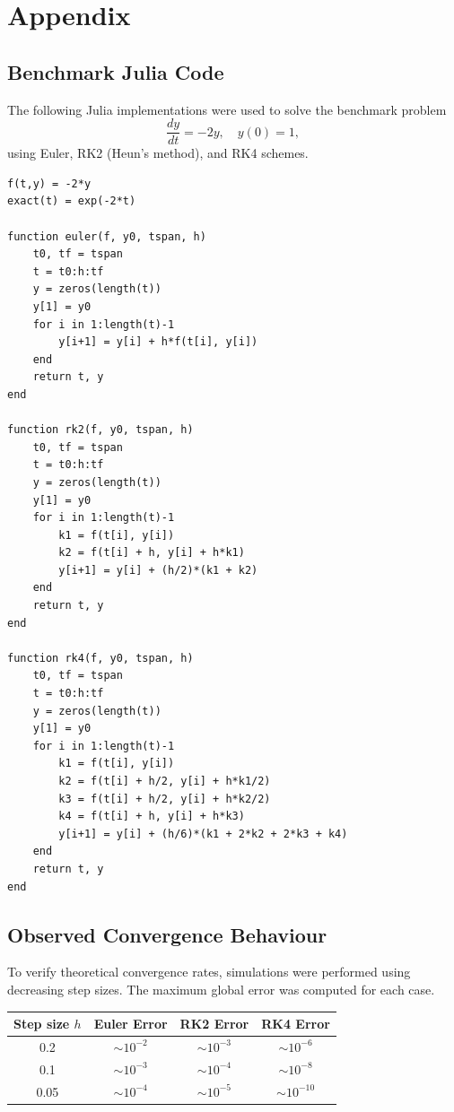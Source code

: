 \documentclass{article}
\begin{document}
\section{Appendix}

\subsection{Benchmark Julia Code}

The following Julia implementations were used to solve the benchmark problem
\[
\frac{dy}{dt} = -2y, \quad y(0)=1,
\]
using Euler, RK2 (Heun’s method), and RK4 schemes.

\begin{verbatim}
f(t,y) = -2*y
exact(t) = exp(-2*t)

function euler(f, y0, tspan, h)
    t0, tf = tspan
    t = t0:h:tf
    y = zeros(length(t))
    y[1] = y0
    for i in 1:length(t)-1
        y[i+1] = y[i] + h*f(t[i], y[i])
    end
    return t, y
end

function rk2(f, y0, tspan, h)
    t0, tf = tspan
    t = t0:h:tf
    y = zeros(length(t))
    y[1] = y0
    for i in 1:length(t)-1
        k1 = f(t[i], y[i])
        k2 = f(t[i] + h, y[i] + h*k1)
        y[i+1] = y[i] + (h/2)*(k1 + k2)
    end
    return t, y
end

function rk4(f, y0, tspan, h)
    t0, tf = tspan
    t = t0:h:tf
    y = zeros(length(t))
    y[1] = y0
    for i in 1:length(t)-1
        k1 = f(t[i], y[i])
        k2 = f(t[i] + h/2, y[i] + h*k1/2)
        k3 = f(t[i] + h/2, y[i] + h*k2/2)
        k4 = f(t[i] + h, y[i] + h*k3)
        y[i+1] = y[i] + (h/6)*(k1 + 2*k2 + 2*k3 + k4)
    end
    return t, y
end
\end{verbatim}

\subsection{Observed Convergence Behaviour}

To verify theoretical convergence rates, simulations were performed using decreasing step sizes. The maximum global error was computed for each case.

\begin{center}
\begin{tabular}{cccc}
\toprule
Step size $h$ & Euler Error & RK2 Error & RK4 Error \\
\midrule
0.2  & $\sim 10^{-2}$ & $\sim 10^{-3}$ & $\sim 10^{-6}$ \\
0.1  & $\sim 10^{-3}$ & $\sim 10^{-4}$ & $\sim 10^{-8}$ \\
0.05 & $\sim 10^{-4}$ & $\sim 10^{-5}$ & $\sim 10^{-10}$ \\
\bottomrule
\end{tabular}
\end{center}
\end{document}
